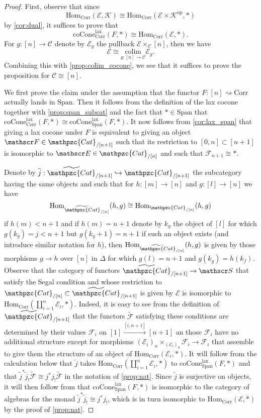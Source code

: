 \documentclass[a4paper, reqno]{amsart}
\theoremstyle{definition}
\newcommand\cC{\mathscr C}
\newcommand\cE{\mathscr E}
\newcommand\cF{\mathscr F}
\newcommand\cK{\mathscr K}
\newcommand\cS{\mathscr S}
\newcommand\mor{\mathrm{Hom}}
\newcommand\op{\mathrm{op}}
\newcommand\ccat{\mathpzc{Cat}}
\newcommand\spanc{\mathrm{Span}}
\newcommand\colim{\mathrm{colim}}
\newcommand\corr{\mathrm{Corr}}
\newcommand\lax{\mathrm{lax}}
\newcommand\coc{\mathrm{coCone}}
\begin{document}
\begin{proof}
First, observe that since 
\[\mor_\corr(\cE,\cK)\cong\mor_\corr(\cE\times\cK^\op,*)\]
by \cref{cor:dual}, it suffices to prove that
\[\coc_\corr^\lax(F,*)\cong\mor_\corr(\cE,*).\]
For $g:[n]\rightarrow\cC$ denote by $\cE_g$ the pullback $\cE\times_\cC [n]$, then we have
\[\cE\cong\underset{g:[n]\rightarrow\cC}{\colim}\cE_g.\]
Combining this with \cref{prop:colim_cocone}, we see that it suffices to prove the proposition for $\cC\cong[n]$.\par
We first prove the claim under the assumption that the functor $F:[n]\rightsquigarrow\corr$ actually lands in $\spanc$. Then it follows from the definition of the lax cocone together with \cref{prop:span_subcat} and the fact that $*\in\spanc$ that $\coc_\corr^\lax(F,*)\cong\coc_\spanc^\lax(F,*)$. It now follows from \cref{cor:lax_span} that giving a lax cocone under $F$ is equivalent to giving an object $\cF\in\ccat_{/[n+1]}$ such that its restriction to $[0,n]\subset[n+1]$ is isomorphic to $\cE\in\ccat_{/[n]}$ and such that $\cF_{n+1}\cong *$.\par
Denote by $\widetilde{j}:\widetilde{\ccat}_{/[n+1]}\hookrightarrow\ccat_{/[n+1]}$ the subcategory having the same objects and such that for $h:[m]\rightarrow[n]$ and $g:[l]\rightarrow[n]$ we have \[\mor_{\widetilde{\ccat}_{/[n]}}(h,g)\cong \mor_{\ccat_{/[n]}}(h,g)\]
if $h(m)<n+1$ and if $h(m)=n+1$ denote by $k_g$ the object of $[l]$ for which $g(k_g)=j<n+1$ but $g(k_g+1)=n+1$ if such an object exists (and introduce similar notation for $h$), then $\mor_{\widetilde{\ccat}_{/[n]}}(h,g)$ is given by those morphisms $g\rightarrow h$ over $[n]$ in $\Delta$ for which $g(l)=n+1$ and $g(k_g)=h(k_f)$. Observe that the category of functors $\widetilde{\ccat}_{/[n+1]}\rightarrow\cS$ that satisfy the Segal condition and whose restriction to $\ccat_{/[n]}\subset\widetilde{\ccat}_{/[n+1]}$ is given by $\cE$ is isomorphic to $\mor_\corr(\coprod_{i=1}^n\cE_i,*)$. Indeed, it is easy to see from the definition of $\widetilde{\ccat}_{/[n+1]}$ that the functors $\widetilde{\cF}$ satisfying these conditions are determined by their values $\cF_i$ on $[1]\xrightarrow{[i,n+1]}[n+1]$ an those $\cF_i$ have no additional structure except for morphisms $(\cE_{i})_n\times_{(\cE_i)_0}\cF_i\rightarrow\cF_i$ that assemble to give them the structure of an object of $\mor_\corr(\cE_i,*)$. It will follow from the calculation below that $\widetilde{j}$ takes $\mor_\corr(\coprod_{i=1}^n\cE_i,*)$ to $\coc_\spanc^\lax(F,*)$ and that $\widetilde{j}^*\widetilde{j}_!\widetilde{\cF}\cong j^*j_!\widetilde{\cF}$ in the notation of \cref{prop:nat}. Since $\widetilde{j}$ is surjective on objects, it will then follow from \cite[Theorem 4.7.3.5.]{luriehigher} that $\coc_\spanc^\lax(F,*)$ is isomorphic to the category of algebras for the monad $\widetilde{j}^*\widetilde{j}_!\cong j^*j_!$, which is in turn isomorphic to $\mor_\corr(\cE,*)$ by the proof of \cref{prop:nat}.\par

\end{proof}
\end{document}
